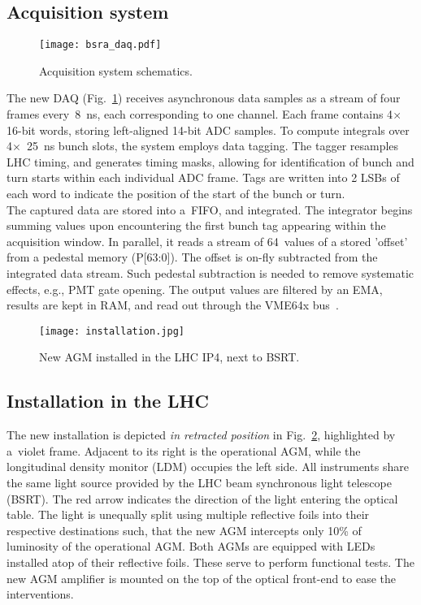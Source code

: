 \subsection{Acquisition system}
\begin{figure}[!tbh]
    \centering
    \texttt{[image: bsra\_daq.pdf]}
    \caption{Acquisition system schematics.}
    \label{fig:bsra_daq}
\end{figure}
%
The new DAQ (Fig.~\ref{fig:bsra_daq}) receives asynchronous data samples as a stream of four frames every~\SI{8}{\nano s}, each corresponding to one channel.
%
Each frame contains 4$\times$16-bit words, storing left-aligned 14-bit ADC samples. 
%
To compute integrals over 4$\times$~\SI{25}{\nano\second} bunch slots, the system employs data tagging. 
%
The tagger resamples LHC timing, and generates timing masks, allowing for identification of bunch and turn starts within each individual ADC frame.
%
Tags are written into 2 LSBs of each word to indicate the position of the start of the bunch or turn.
\\
%
The captured data are stored into a~FIFO, and integrated. 
%
The integrator begins summing values upon encountering the first bunch tag appearing within the acquisition window.
%
In parallel, it reads a stream of 64~values of a stored 'offset' from a pedestal memory (P[63:0]).
%
The offset is on-fly subtracted from the integrated data stream. 
%
Such pedestal subtraction is needed to remove systematic effects, e.g., PMT gate opening. 
%
The output values are filtered by an EMA, results are kept in RAM, and read out through the VME64x bus~\cite{my_thesis}.

\begin{figure}[!tbh]
    \centering
    \texttt{[image: installation.jpg]}
    \caption{New AGM installed in the LHC IP4, next to BSRT.}
    \label{fig:installation}
\end{figure}

\subsection{Installation in the LHC}

The new installation is depicted \textit{in retracted position} in Fig.~\ref{fig:installation}, highlighted by a~violet frame.
%
Adjacent to its right is the operational AGM, while the longitudinal density monitor (LDM) occupies the left side.
%
All instruments share the same light source provided by the LHC beam synchronous light telescope (BSRT).
%
The red arrow indicates the direction of the light entering the optical table.
%
The light is unequally split using multiple reflective foils into their respective destinations such, that the new AGM intercepts only 10\% of luminosity of the operational AGM.
%
Both AGMs are equipped with LEDs installed atop of their reflective foils.
%
These serve to perform functional tests.
%
The new AGM amplifier is mounted on the top of the optical front-end to ease the interventions.

